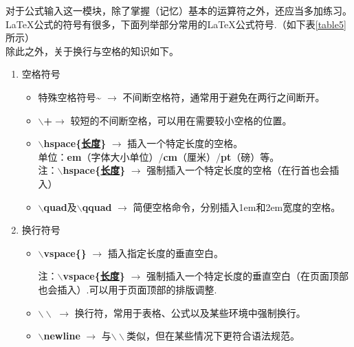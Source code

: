 \documentclass[11pt]{article}
\let\Oldlatex\LaTeX
\renewcommand{\LaTeX}{\textrm{\Oldlatex}}
\begin{document}
    对于公式输入这一模块，除了掌握（记忆）基本的运算符之外，还应当多加练习。\LaTeX 公式的符号有很多，下面列举部分常用的\LaTeX 公式符号.（如下表\ref{table5}所示）\\
    除此之外，关于换行与空格的知识如下。
    \begin{enumerate}
    	\item 空格符号
    	\begin{itemize}
    		\item 特殊空格符号\textbf{\~{}} $\to$ 不间断空格符，通常用于避免在两行之间断开。
    		\item \textbf{$\backslash$+}$\to$ 较短的不间断空格，可以用在需要较小空格的位置。
    		\item \textbf{$\backslash$hspace\{\underline{长度}\}} $\to$ 插入一个特定长度的空格。 \\
    		单位：\textbf{em}{\small （字体大小单位）}/\textbf{cm}{\small （厘米）}/\textbf{pt}{\small （磅）}等。\\
    		{\footnotesize *注：\textbf{$\backslash$hspace\textbf{{\large *}}\{\underline{长度}\}} $\to$ 强制插入一个特定长度的空格（在行首也会插入）}
    		\item \textbf{$\backslash$quad}及\textbf{$\backslash$qquad} $\to$ 简便空格命令，分别插入1em和2em宽度的空格。
    	\end{itemize}
    	\item 换行符号
    	\begin{itemize}
    		\item \textbf{$\backslash$vspace\{\}} $\to$ 插入指定长度的垂直空白。
    		\begin{center}
    		\end{center}
    		{\footnotesize *注：\textbf{$\backslash$vspace\textbf{{\large *}}\{\underline{长度}\}} $\to$ 强制插入一个特定长度的垂直空白（在页面顶部也会插入）.可以用于页面顶部的排版调整.}
    		\item \textbf{$\backslash\backslash$} $\to$ 换行符，常用于表格、公式以及某些环境中强制换行。
    		\item \textbf{$\backslash$newline} $\to$ 与$\backslash\backslash$类似，但在某些情况下更符合语法规范。
    		\begin{center}

\end{center}
\end{itemize}
\end{enumerate}
\end{document}
